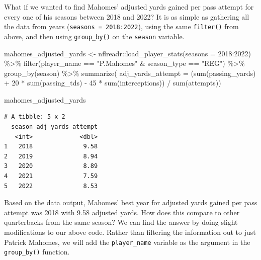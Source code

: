 \documentclass[
  letterpaper,
]{krantz}
\newenvironment{Shaded}{\begin{snugshade}}{\end{snugshade}}
\newcommand{\AttributeTok}[1]{\textcolor[rgb]{0.40,0.45,0.13}{#1}}
\newcommand{\DecValTok}[1]{\textcolor[rgb]{0.68,0.00,0.00}{#1}}
\newcommand{\FunctionTok}[1]{\textcolor[rgb]{0.28,0.35,0.67}{#1}}
\newcommand{\NormalTok}[1]{\textcolor[rgb]{0.00,0.23,0.31}{#1}}
\newcommand{\OtherTok}[1]{\textcolor[rgb]{0.00,0.23,0.31}{#1}}
\newcommand{\SpecialCharTok}[1]{\textcolor[rgb]{0.37,0.37,0.37}{#1}}
\newcommand{\StringTok}[1]{\textcolor[rgb]{0.13,0.47,0.30}{#1}}
\begin{document}
What if we wanted to find Mahomes' adjusted yards gained per pass
attempt for every one of his seasons between 2018 and 2022? It is as
simple as gathering all the data from years
(\texttt{seasons\ =\ 2018:2022}), using the same \texttt{filter()} from
above, and then using \texttt{group\_by()} on the \texttt{season}
variable.

\begin{Shaded}
\begin{Highlighting}[]
\NormalTok{mahomes\_adjusted\_yards }\OtherTok{\textless{}{-}}\NormalTok{ nflreadr}\SpecialCharTok{::}\FunctionTok{load\_player\_stats}\NormalTok{(}\AttributeTok{seasons =} \DecValTok{2018}\SpecialCharTok{:}\DecValTok{2022}\NormalTok{) }\SpecialCharTok{\%\textgreater{}\%}
  \FunctionTok{filter}\NormalTok{(player\_name }\SpecialCharTok{==} \StringTok{"P.Mahomes"} \SpecialCharTok{\&}\NormalTok{ season\_type }\SpecialCharTok{==} \StringTok{"REG"}\NormalTok{) }\SpecialCharTok{\%\textgreater{}\%}
  \FunctionTok{group\_by}\NormalTok{(season) }\SpecialCharTok{\%\textgreater{}\%}
  \FunctionTok{summarize}\NormalTok{(}
    \AttributeTok{adj\_yards\_attempt =}\NormalTok{ (}\FunctionTok{sum}\NormalTok{(passing\_yards) }\SpecialCharTok{+} \DecValTok{20} \SpecialCharTok{*}
                           \FunctionTok{sum}\NormalTok{(passing\_tds) }\SpecialCharTok{{-}} \DecValTok{45} \SpecialCharTok{*}
                           \FunctionTok{sum}\NormalTok{(interceptions)) }\SpecialCharTok{/} \FunctionTok{sum}\NormalTok{(attempts))}

\NormalTok{mahomes\_adjusted\_yards}
\end{Highlighting}
\end{Shaded}

\begin{verbatim}
# A tibble: 5 x 2
  season adj_yards_attempt
   <int>             <dbl>
1   2018              9.58
2   2019              8.94
3   2020              8.89
4   2021              7.59
5   2022              8.53
\end{verbatim}

Based on the data output, Mahomes' best year for adjusted yards gained
per pass attempt was 2018 with 9.58 adjusted yards. How does this
compare to other quarterbacks from the same season? We can find the
answer by doing slight modifications to our above code. Rather than
filtering the information out to just Patrick Mahomes, we will add the
\texttt{player\_name} variable as the argument in the
\texttt{group\_by()} function.
\end{document}
